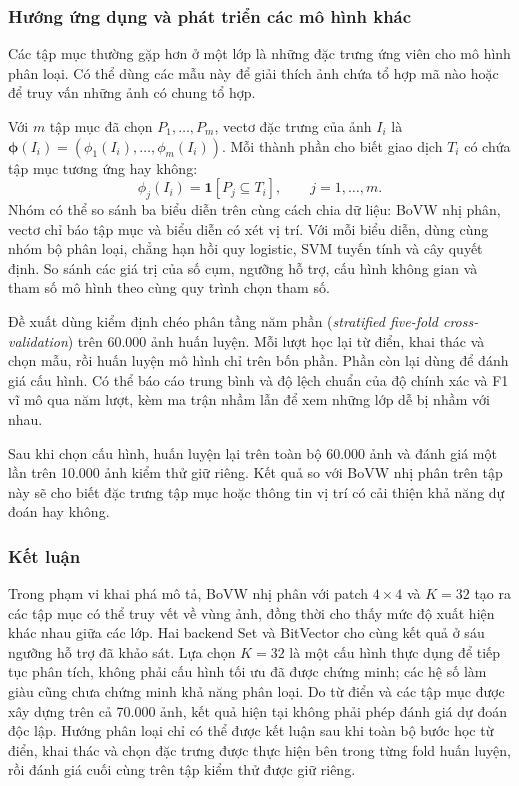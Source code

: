 \subsubsection{Hướng ứng dụng và phát triển các mô hình khác}

Các tập mục thường gặp hơn ở một lớp là những đặc trưng ứng viên
cho mô hình phân loại. Có thể dùng các mẫu này để giải thích ảnh
chứa tổ hợp mã nào hoặc để truy vấn những ảnh có chung tổ hợp.

Với $m$ tập mục đã chọn $P_1,\ldots,P_m$, vectơ đặc trưng của ảnh $I_i$ là $\boldsymbol{\phi}(I_i)=(\phi_1(I_i),\ldots,\phi_m(I_i))$. Mỗi thành phần cho biết giao dịch $T_i$ có chứa tập mục tương ứng hay không:
\begin{equation}
    \phi_j(I_i)=\mathbf{1}\!\left[P_j\subseteq T_i\right],
    \qquad j=1,\ldots,m.
    \label{eq:fim_pattern_features}
\end{equation}
Nhóm có thể so sánh ba biểu diễn trên cùng cách chia dữ liệu:
BoVW nhị phân, vectơ chỉ báo tập mục và biểu diễn có xét vị trí.
Với mỗi biểu diễn, dùng cùng nhóm bộ phân loại, chẳng hạn hồi quy
logistic, SVM tuyến tính và cây quyết định. So sánh các giá trị của
số cụm, ngưỡng hỗ trợ, cấu hình không gian và tham số mô hình
theo cùng quy trình chọn tham số.

Đề xuất dùng kiểm định chéo phân tầng năm phần
(\textit{stratified five-fold cross-validation}) trên 60.000 ảnh
huấn luyện. Mỗi lượt học lại từ điển, khai thác và chọn mẫu, rồi
huấn luyện mô hình chỉ trên bốn phần. Phần còn lại dùng để đánh
giá cấu hình. Có thể báo cáo trung bình và độ lệch chuẩn của độ
chính xác và F1 vĩ mô qua năm lượt, kèm ma trận nhầm lẫn để xem những lớp dễ bị nhầm với nhau.

Sau khi chọn cấu hình, huấn luyện lại trên toàn bộ 60.000 ảnh
và đánh giá một lần trên 10.000 ảnh kiểm thử giữ riêng. Kết quả
so với BoVW nhị phân trên tập này sẽ cho biết đặc trưng tập mục
hoặc thông tin vị trí có cải thiện khả năng dự đoán hay không.

\subsubsection{Kết luận}

Trong phạm vi khai phá mô tả, BoVW nhị phân với patch $4\times4$
và $K=32$ tạo ra các tập mục có thể truy vết về vùng ảnh, đồng thời
cho thấy mức độ xuất hiện khác nhau giữa các lớp. Hai backend Set
và BitVector cho cùng kết quả ở sáu ngưỡng hỗ trợ đã khảo sát.
Lựa chọn $K=32$ là một cấu hình thực dụng để tiếp tục phân tích,
không phải cấu hình tối ưu đã được chứng minh; các hệ số làm giàu
cũng chưa chứng minh khả năng phân loại. Do từ điển và các tập mục
được xây dựng trên cả 70.000 ảnh, kết quả hiện tại không phải phép
đánh giá dự đoán độc lập. Hướng phân loại chỉ có thể được kết luận
sau khi toàn bộ bước học từ điển, khai thác và chọn đặc trưng được
thực hiện bên trong từng fold huấn luyện, rồi đánh giá cuối cùng trên
tập kiểm thử được giữ riêng.
